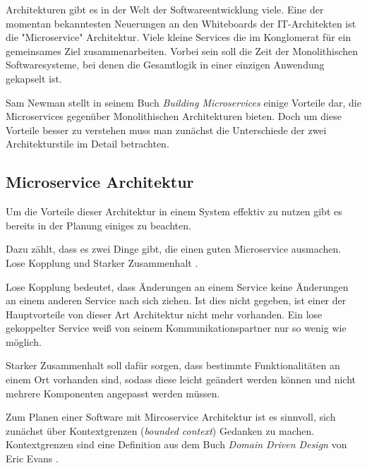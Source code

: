 \documentclass[12pt,a4paper,bibliography=totocnumbered,listof=totocnumbered]{scrartcl}
\begin{document}
Architekturen gibt es in der Welt der Softwareentwicklung viele. Eine der momentan bekanntesten Neuerungen an den Whiteboards der IT-Architekten ist die "Microservice" Architektur. Viele kleine Services die im Konglomerat für ein gemeinsames Ziel zusammenarbeiten. Vorbei sein soll die Zeit der Monolithischen Softwaresysteme, bei denen die Gesamtlogik in einer einzigen Anwendung gekapselt ist.


Sam Newman stellt in seinem Buch \textit{Building Microservices}\cite{buildingms} einige Vorteile dar, die Microservices gegenüber Monolithischen Architekturen bieten. Doch um diese Vorteile besser zu verstehen muss man zunächst die Unterschiede der zwei Architekturstile im Detail betrachten.

\subsection{Microservice Architektur}\label{ch:ms-arch}

Um die Vorteile dieser Architektur in einem System effektiv zu nutzen gibt es bereits in der Planung einiges zu beachten.

Dazu zählt, dass es zwei Dinge gibt, die einen guten Microservice ausmachen. Lose Kopplung und Starker Zusammenhalt \cite[S.62]{buildingms}.

Lose Kopplung bedeutet, dass Änderungen an einem Service keine Änderungen an einem anderen Service nach sich ziehen. Ist dies nicht gegeben, ist einer der Hauptvorteile von dieser Art Architektur nicht mehr vorhanden.
Ein lose gekoppelter Service weiß von seinem Kommunikationspartner nur so wenig wie möglich.\cite[S.63]{buildingms}

Starker Zusammenhalt soll dafür sorgen, dass bestimmte Funktionalitäten an einem Ort vorhanden sind, sodass diese leicht geändert werden können und nicht mehrere Komponenten angepasst werden müssen.\cite[S.64]{buildingms}

Zum Planen einer Software mit Mircoservice Architektur ist es sinnvoll, sich zunächst über Kontextgrenzen (\textit{bounded context}) Gedanken zu machen. Kontextgrenzen sind eine Definition aus dem Buch \textit{Domain Driven Design} von Eric Evans \cite{dddesign}.
\end{document}
